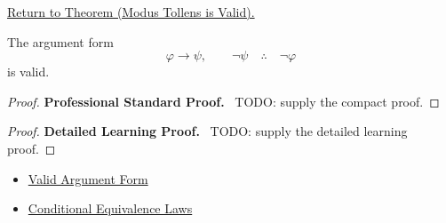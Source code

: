 \newpage
{}
\label{prf:modus-tollens-validity-propositional-logic}

\begin{remark*}[Return]
\hyperref[thm:modus-tollens-validity-propositional-logic]{Return to Theorem (Modus Tollens is Valid).}
\end{remark*}

\begin{theorem*}
The argument form
\[
\varphi\to\psi,\qquad \neg\psi \quad\therefore\quad \neg\varphi
\]
is valid.
\end{theorem*}

\begin{proof}
\textbf{Professional Standard Proof.}~
TODO: supply the compact proof.
\end{proof}

\begin{proof}
\textbf{Detailed Learning Proof.}~
TODO: supply the detailed learning proof.
\end{proof}

\begin{remark*}
\end{remark*}

\begin{dependencies}
\begin{itemize}
  \item \hyperref[def:valid-argument-form-propositional-logic]{Valid Argument Form}
  \item \hyperref[thm:conditional-equivalence-laws-propositional-logic]{Conditional Equivalence Laws}
\end{itemize}
\end{dependencies}

\clearpage
